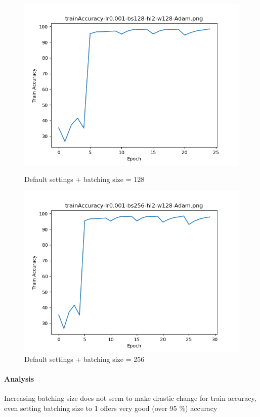 \documentclass{article}[12pt]
\begin{document}
        \begin{figure}[H]
        \includegraphics[width=\linewidth]{testsResults/trainAccuracy/trainAccuracy-lr0.001-bs128-hl2-w128-Adam.png}
        \caption{Default settings + batching size = 128}
        \endminipage
        \includegraphics[width=\linewidth]{testsResults/trainAccuracy/trainAccuracy-lr0.001-bs256-hl2-w128-Adam.png}
        \caption{Default settings + batching size = 256}
        \endminipage
    \end{figure}

    \paragraph{Analysis} Increasing batching size does not seem to make drastic change for train accuracy, even setting batching size to 1 offers very good (over 95 \%) accuracy
\end{document}
